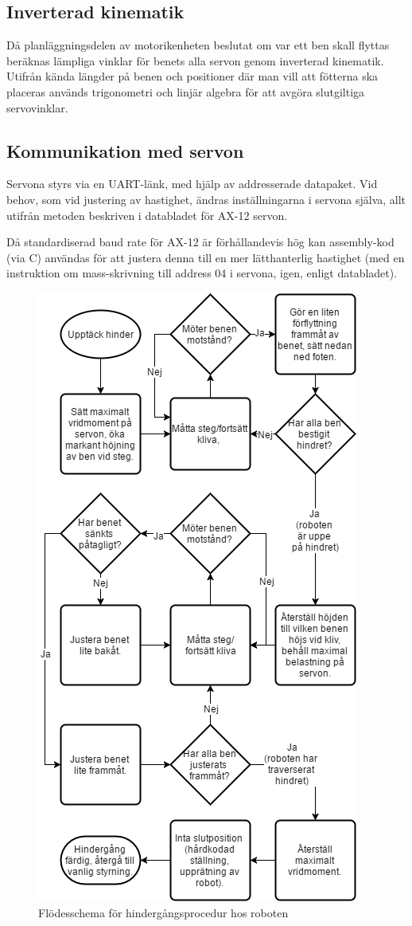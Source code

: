 \documentclass[a4paper,titlepage,12pt]{article}
\begin{document}
	\subsection{Inverterad kinematik}
	\label{sub:inverterad-kinematik}
	Då planläggningsdelen av motorikenheten beslutat om var ett ben skall flyttas beräknas 
	lämpliga vinklar för benets alla servon genom inverterad kinematik. Utifrån kända 
	längder på benen och positioner där man vill att fötterna ska placeras används 
	trigonometri och linjär algebra för att avgöra slutgiltiga servovinklar.

	\subsection{Kommunikation med servon}
	Servona styrs via en UART-länk, med hjälp av addresserade datapaket. Vid behov, 
	som vid justering av hastighet, ändras inställningarna i servona själva, allt 
	utifrån metoden beskriven i databladet för AX-12 servon.
	
	Då standardiserad baud rate för AX-12 är förhållandevis hög kan assembly-kod (via C) 
	användas för att justera denna till en mer lätthanterlig hastighet (med en instruktion
	om mass-skrivning till address 04 i servona, igen, enligt databladet).
	
	\begin{figure}[h!]
		\centering
		\includegraphics[width=0.5\linewidth]{images/hindergang_flowchart.png}
		\caption{Flödesschema för hindergångsprocedur hos roboten \label{fig:walkflow1}}
	\end{figure}
    
\end{document}
